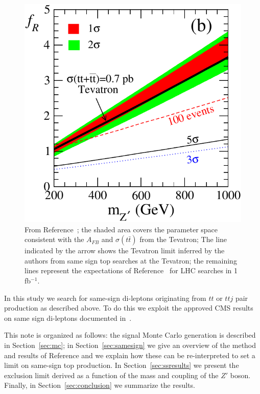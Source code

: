 \begin{figure}[htb]
\begin{center}
\includegraphics[width=0.6\linewidth]{figs/berger_limit.pdf}
\caption{\protect From Reference~\cite{berger}; the shaded area covers the parameter
space consistent with the $A_{FB}$ and $\sigma(t\bar{t})$ from the Tevatron;
The line indicated by the arrow shows the Tevatron limit inferred by the authors
from same sign top searches at the Tevatron; the remaining lines represent the
expectations of Reference~\cite{berger}
for LHC searches in 1 fb$^{-1}$. \label{fig:berger_limit}}
\end{center}
\end{figure}




In this study we search for same-sign di-leptons originating from $tt$ 
or $ttj$ pair production as described above.
To do this we exploit the approved CMS results on same sign di-leptons documented in~\cite{ssnote1, sspaper}.

This note is organized as follows: 
the signal Monte Carlo generation is described in Section~\ref{sec:mc};
in Section~\ref{sec:samesign} we give an overview of the method and results of Reference \cite{sspaper}
and we explain how these can be re-interpreted to set a limit on same-sign top production.
In Section~\ref{sec:ssresults} we present the exclusion limit derived 
as a function of the mass and coupling of the $Z'$ boson.
Finally, in Section~\ref{sec:conclusion} we summarize the results.  






